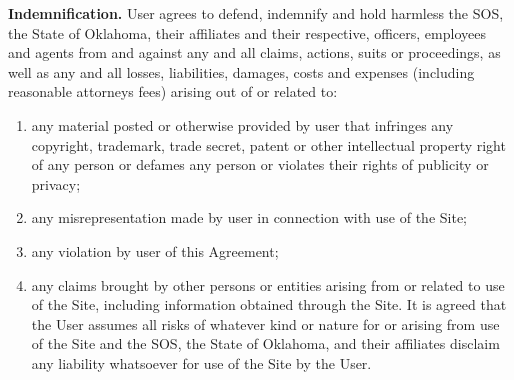 \textbf{Indemnification.}
User agrees to defend, indemnify and hold harmless the SOS, the State of
Oklahoma, their affiliates and their respective, officers, employees and agents
from and against any and all claims, actions, suits or proceedings, as well as
any and all losses, liabilities, damages, costs and expenses (including
reasonable attorneys fees) arising out of or related to:
\begin{enumerate}[label = \EnumerateLabel]
    \item any material posted or otherwise provided by user that infringes any
    copyright, trademark, trade secret, patent or other intellectual property
    right of any person or defames any person or violates their rights of
    publicity or privacy;
    \item any misrepresentation made by user in connection with use of the Site;
    \item any violation by user of this Agreement;
    \item any claims brought by other persons or entities arising from or
    related to use of the Site, including information obtained through the Site.
    It is agreed that the User assumes all risks of whatever kind or nature for
    or arising from use of the Site and the SOS, the State of Oklahoma, and
    their affiliates disclaim any liability whatsoever for use of the Site by
    the User.
\end{enumerate}
